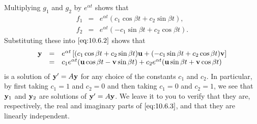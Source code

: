 \documentclass{ximera}
\begin{document}
Multiplying  $g_1$  and $g_2$  by $e^{\alpha t}$ shows that
\begin{eqnarray*}
f_1&=&e^{\alpha t}(c_1\cos\beta t+c_2\sin\beta t ),\\
f_2&=&e^{\alpha t}(-c_1\sin\beta t+c_2\cos\beta t).
\end{eqnarray*}
Substituting these into $\eqref{eq:10.6.2}$ shows that
\begin{equation} \label{eq:10.6.5}
\begin{array}{rcl}
{\bf y}&=&e^{\alpha t}\left[(c_1\cos\beta t+c_2\sin\beta t){\bf u}
+(-c_1\sin\beta t+c_2\cos\beta t){\bf v}\right]\\
&=&c_1e^{\alpha t}({\bf u}\cos\beta t-{\bf v}\sin\beta t)
+c_2e^{\alpha t}({\bf u}\sin\beta t+{\bf v}\cos\beta t)
\end{array}
\end{equation}
is a solution of ${\bf y}'=A{\bf y}$ for any choice of the constants
$c_1$ and $c_2$. In particular, by first taking $c_1=1$ and $c_2=0$
and then taking $c_1=0$ and $c_2=1$, we see that ${\bf y}_1$ and ${\bf
y}_2$ are solutions of $ {\bf y}'=A{\bf y}$. We leave it to you to
verify that they are, respectively, the real and imaginary parts of
$\eqref{eq:10.6.3}$, %
and that they are linearly
independent. %
\end{document}
